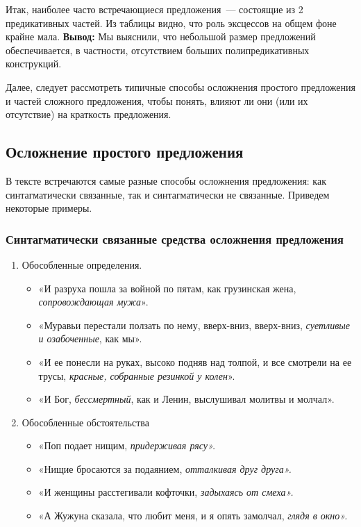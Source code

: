 \documentclass{kursa4}
\begin{document}
{        Итак, наиболее часто встречающиеся предложения~--- состоящие из 2 предикативных частей. Из таблицы видно, что роль эксцессов на общем фоне крайне мала. \textbf{Вывод:}
        Мы выяснили, что небольшой размер предложений обеспечивается, в частности, отсутствием больших полипредикативных конструкций. 

        Далее, следует рассмотреть типичные способы осложнения простого предложения и частей сложного предложения, чтобы понять, влияют ли они (или их отсутствие) на краткость предложения. \subsection{Осложнение простого предложения}

        В тексте встречаются самые разные способы осложнения предложения: как синтагматически связанные, так и синтагматически не связанные. Приведем некоторые примеры. \subsubsection{Синтагматически связанные средства осложнения предложения}

          \begin{enumerate}
            \item Обособленные определения. \begin{itemize}
              \item «И разруха пошла за войной по пятам, как грузинская жена, \textit{сопровождающая мужа}». \item «Муравьи перестали ползать по нему, вверх-вниз, вверх-вниз, \textit{суетливые и озабоченные}, как мы». \item «И ее понесли на руках, высоко подняв над толпой, и все смотрели на ее трусы, \textit{красные, собранные резинкой у колен}». \item «И Бог, \textit{бессмертный}, как и Ленин, выслушивал молитвы и молчал». \end{itemize}

            \item Обособленные обстоятельства \begin{itemize}
              \item «Поп подает нищим, \textit{придерживая рясу».}
              \item «Нищие бросаются за подаянием, \textit{отталкивая друг друга».}
              \item «И женщины расстегивали кофточки, \textit{задыхаясь от смеха».}
              \item «А Жужуна сказала, что любит меня, и я опять замолчал,\textit{
              глядя в окно».}
            \end{itemize}


\end{enumerate}}
\end{document}
